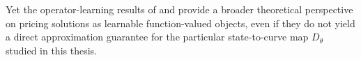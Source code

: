 Yet the operator-learning results of \citet{Benth2023} and \citet{Benth2024} provide a broader theoretical perspective on pricing solutions as learnable function-valued objects, even if they do not yield a direct approximation guarantee for the particular state-to-curve map $D_\theta$ studied in this thesis. 



